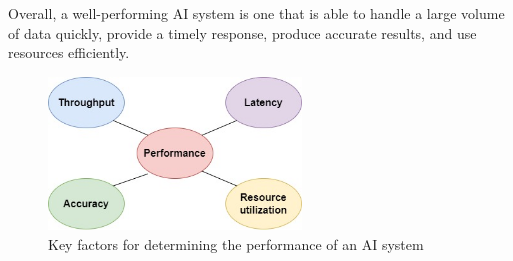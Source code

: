 Overall, a well-performing AI system is one that is able to handle a 
large volume of data quickly, provide a timely response, produce accurate 
results, and use resources efficiently.
\\
\begin{figure}[htb]
    \centering
    \includegraphics[width=0.6\textwidth]{pics/performance.jpg}
    \caption{Key factors for determining the performance of an AI system}
    \label{fig:performance}
\end{figure}
\\

